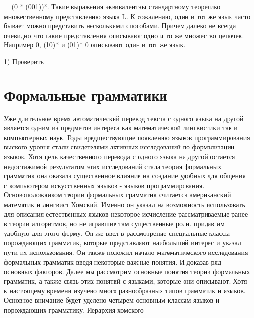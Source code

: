 {= (0 * (001))*. Такие выражения эквивалентны стандартному теоретико множественному представлению языка L. К сожалению, один и тот же язык часто бывает можно представить несколькими способами. Причем далеко не всегда очевидно что такие представления описывают одно и то же множество цепочек. Например 0, (10)* и (01)* 0 описывают один и тот же язык.

1) Проверить

\section{Формальные грамматики}
Уже длительное время автоматический перевод текста с одного языка на другой является одним из предметов интереса как математической лингвистики так и компьютерных наук.
Годы вредществующие появлению языков программирования выского уровня стали свидетелями активных исследований по формализации языков. Хотя цель качественного перевода с одного языка на другой остается недостижимой результатом этих исследований стала теория формальных грамматик она оказала существенное влияние на создание удобных для общения с компьютером искусственных языков - языков программирования. Основоположником теории формальных грамматик считается американский математик и лингвист Хомский. Именно он указал на возможность использовать для описания естественных языков некоторое исчисление рассматриваемые ранее в теории алгоритмов, но не игравшие там существенные роли. придав им удобную для этого форму. Он же ввел в рассмотрение специальные классы порождающих грамматик, которые представляют наибольший интерес и указал пути их использования. Он также положил начало математического исследования формальных грамматик введя некоторые важные понятия. И доказав ряд основных факторов. Далее мы рассмотрим основные понятия теории формальных грамматик, а также связь этих понятий с языками, которые они описывают. Хотя к настоящему времени изучено много разнообразных типов грамматик и языков. Основное внимание будет уделено четырем основным классам языков и порождающих грамматику. Иерархия хомского

}

